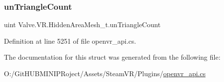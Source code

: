 \subsubsection{\texorpdfstring{unTriangleCount}{unTriangleCount}}
{\footnotesize\ttfamily uint Valve.\+V\+R.\+Hidden\+Area\+Mesh\+\_\+t.\+un\+Triangle\+Count}



Definition at line 5251 of file openvr\+\_\+api.\+cs.



The documentation for this struct was generated from the following file\+:\begin{DoxyCompactItemize}
\item 
O\+:/\+Git\+H\+U\+B\+M\+I\+N\+I\+P\+Roject/\+Assets/\+Steam\+V\+R/\+Plugins/\mbox{\hyperlink{openvr__api_8cs}{openvr\+\_\+api.\+cs}}\end{DoxyCompactItemize}
